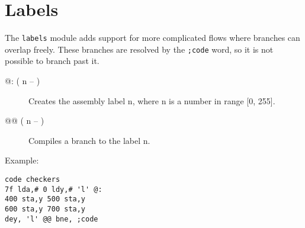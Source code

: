 \section{Labels}

The \texttt{labels} module adds support for more complicated flows where branches can overlap freely. These branches are resolved by the \texttt{;code} word, so it is not possible to branch past it.

\begin{description}
    \item[@: ( n -- )] Creates the assembly label n, where n is a number in range [0, 255].
    \item[@@ ( n -- )] Compiles a branch to the label n.
\end{description}

Example:

\begin{verbatim}
code checkers
7f lda,# 0 ldy,# 'l' @:
400 sta,y 500 sta,y
600 sta,y 700 sta,y
dey, 'l' @@ bne, ;code
\end{verbatim}

